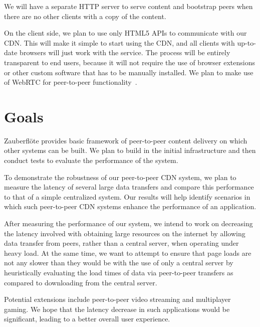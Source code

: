 \documentclass[letterpaper,twocolumn,10pt]{article}
\begin{document}
We will have a separate HTTP server to serve content and bootstrap peers when
there are no other clients with a copy of the content.

On the client side, we plan to use only HTML5 APIs to communicate with our CDN.
This will make it simple to start using the CDN, and all clients with
up-to-date browsers will just work with the service. The process will be
entirely transparent to end users, because it will not require the use of
browser extensions or other custom software that has to be manually installed.
We plan to make use of WebRTC for peer-to-peer functionality~\cite{w3c:webrtc}.

\section{Goals}

Zauberfl\"{o}te provides basic framework of peer-to-peer content delivery on
which other systems can be built. We plan to build in the initial
infrastructure and then conduct tests to evaluate the performance of the
system.

To demonstrate the robustness of our peer-to-peer CDN system, we plan to
measure the latency of several large data transfers and compare this
performance to that of a simple centralized system. Our results will help
identify scenarios in which such peer-to-peer CDN systems enhance the
performance of an application.

After measuring the performance of our system, we intend to work on decreasing
the latency involved with obtaining large resources on the internet by allowing
data transfer from peers, rather than a central server, when operating under
heavy load. At the same time, we want to attempt to ensure that page loads are
not any slower than they would be with the use of only a central server by
heuristically evaluating the load times of data via peer-to-peer transfers as
compared to downloading from the central server.

Potential extensions include peer-to-peer video streaming and multiplayer
gaming. We hope that the latency decrease in such applications would be
significant, leading to a better overall user experience.

{\footnotesize 
}
\end{document}
